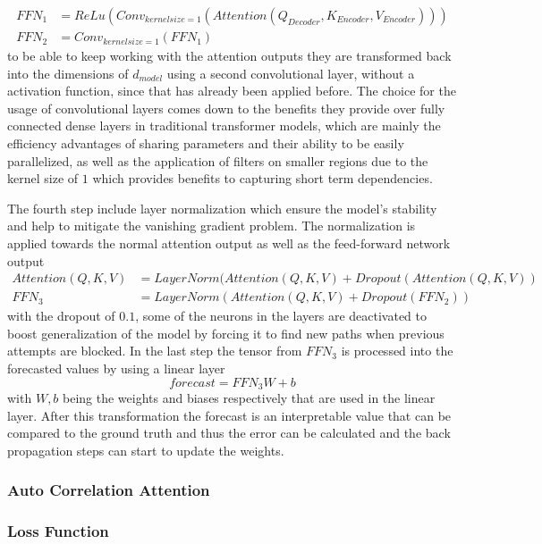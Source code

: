 \documentclass{article}
\begin{document}
\begin{align}\label{eq: decoder-ffn}
    FFN_1 &= ReLu(Conv_{kernelsize = 1}(Attention(Q_{Decoder}, K_{Encoder}, V_{Encoder}))) \\
    FFN_2 &= Conv_{kernelsize = 1}(FFN_1)
\end{align}
to be able to keep working with the attention outputs they are transformed back into the dimensions of $d_{model}$ using a second convolutional layer, without a activation function, since that has already been applied before. The choice for the usage of convolutional layers comes down to the benefits they provide over fully connected dense layers in traditional transformer models, which are mainly the efficiency advantages of sharing parameters and their ability to be easily parallelized, as well as the application of filters on smaller regions due to the kernel size of $1$ which provides benefits to capturing short term dependencies.

The fourth step include layer normalization which ensure the model's stability and help to mitigate the vanishing gradient problem. The normalization is applied towards the normal attention output as well as the feed-forward network output
\begin{align}
    Attention(Q,K,V) &= LayerNorm(Attention(Q,K,V) + Dropout(Attention(Q,K,V)) \\
    FFN_3 &= LayerNorm(Attention(Q,K,V) + Dropout(FFN_2))
\end{align}
with the dropout of $0.1$, some of the neurons in the layers are deactivated to boost generalization of the model by forcing it to find new paths when previous attempts are blocked.
In the last step the tensor from $FFN_3$ is processed into the forecasted values by using a linear layer
\begin{equation}
    forecast = FFN_3 W + b
\end{equation}
with $W, b$ being the weights and biases respectively that are used in the linear layer. After this transformation the forecast is an interpretable value that can be compared to the ground truth and thus the error can be calculated and the back propagation steps can start to update the weights.

\subsubsection{Auto Correlation Attention}

\subsubsection{Loss Function}
\end{document}

